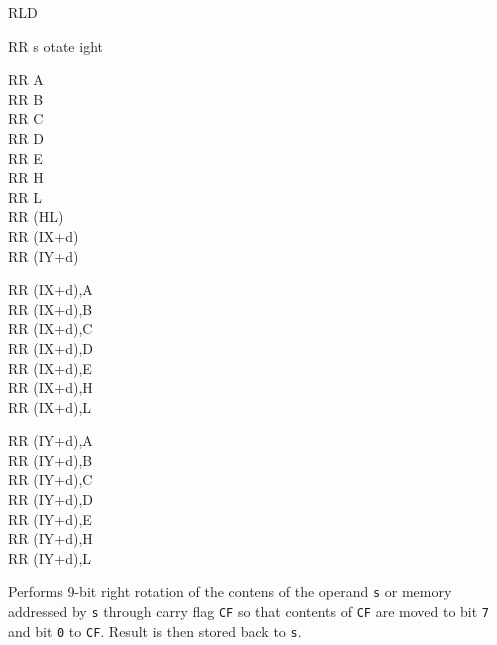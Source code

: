 \begin{basedescript}{
	\desclabelstyle{\multilinelabel}
	\desclabelwidth{3cm}}
\begin{DetailItem}{RLD}
		\begin{DetailTiming}
		\end{DetailTiming}


	\end{DetailItem}

	\begin{DetailItem}{RR s}
		{otate ight}
		{}

		\begin{DetailVariants}
			RR A\\
			RR B\\
			RR C\\
			RR D\\
			RR E\\
			RR H\\
			RR L\\
			RR (HL)\\
			RR (IX+d)\\
			RR (IY+d)

			\columnbreak
			RR (IX+d),A\UNDOC\\
			RR (IX+d),B\UNDOC\\
			RR (IX+d),C\UNDOC\\
			RR (IX+d),D\UNDOC\\
			RR (IX+d),E\UNDOC\\
			RR (IX+d),H\UNDOC\\
			RR (IX+d),L\UNDOC

			\columnbreak
			RR (IY+d),A\UNDOC\\
			RR (IY+d),B\UNDOC\\
			RR (IY+d),C\UNDOC\\
			RR (IY+d),D\UNDOC\\
			RR (IY+d),E\UNDOC\\
			RR (IY+d),H\UNDOC\\
			RR (IY+d),L\UNDOC
		\end{DetailVariants}

		Performs 9-bit right rotation of the contens of the operand {\tt s} or memory addressed by {\tt s} through carry flag {\tt CF} so that contents of {\tt CF} are moved to bit {\tt 7} and bit {\tt 0} to {\tt CF}. Result is then stored back to {\tt s}.


\end{DetailItem}
\end{basedescript}
